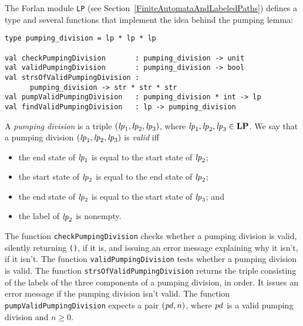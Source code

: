 %
The Forlan module \texttt{LP}
(see Section~\ref{FiniteAutomataAndLabeledPaths}) defines a type and
several functions that implement the idea behind the pumping lemma:
\begin{verbatim}
type pumping_division = lp * lp * lp

val checkPumpingDivision       : pumping_division -> unit
val validPumpingDivision       : pumping_division -> bool
val strsOfValidPumpingDivision :
      pumping_division -> str * str * str
val pumpValidPumpingDivision   : pumping_division * int -> lp
val findValidPumpingDivision   : lp -> pumping_division
\end{verbatim}
%
%
%
%
%
%
A \emph{pumping division} is a triple $({\it lp}_1,{\it lp}_2,{\it lp}_3)$,
where ${\it lp}_1,{\it lp}_2,{\it lp}_3\in\mathbf{LP}$.  We say that a pumping division
$({\it lp}_1,{\it lp}_2,{\it lp}_3)$ is \emph{valid} iff
\begin{itemize}
\item the end state of ${\it lp}_1$ is equal to the start state of ${\it lp}_2$;

\item the start state of ${\it lp}_2$ is equal to the end state of ${\it lp}_2$;

\item the end state of ${\it lp}_2$ is equal to the start state of ${\it lp}_3$; and

\item the label of ${\it lp}_2$ is nonempty.
\end{itemize}
The function \texttt{checkPumpingDivision} checks whether a pumping
division is valid, silently returning \texttt{()}, if it is, and
issuing an error message explaining why it isn't, if it isn't.  The
function \texttt{validPumpingDivision} tests whether a pumping
division is valid.  The function \texttt{strsOfValidPumpingDivision}
returns the triple consisting of the labels of the three components of
a pumping division, in order.  It issues an error message if the pumping
division isn't valid.
The function \texttt{pumpValidPumpingDivision} expects a pair
$({\it pd}, n)$, where ${\it pd}$ is a valid pumping division and $n\geq 0$.
